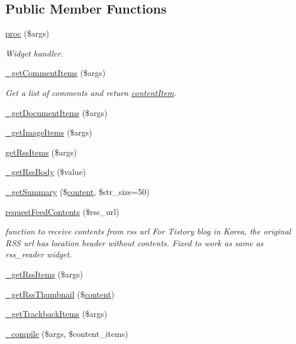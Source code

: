 \subsection*{Public Member Functions}
\begin{DoxyCompactItemize}
\item 
\hyperlink{classcontent_aacac5eb20ef4b64552d77bd5d2e2bf99}{proc} (\$args)
\begin{DoxyCompactList}\small\item\em Widget handler. \end{DoxyCompactList}\item 
\hyperlink{classcontent_a257f112a3719c28356bd49c336d3ad2f}{\+\_\+get\+Comment\+Items} (\$args)
\begin{DoxyCompactList}\small\item\em Get a list of comments and return \hyperlink{classcontentItem}{content\+Item}. \end{DoxyCompactList}\item 
\hyperlink{classcontent_ac3e0ed7e0c14712bd93e68cae1603e2f}{\+\_\+get\+Document\+Items} (\$args)
\item 
\hyperlink{classcontent_abdff6ddbe036e410913b5da1b9a5ce1b}{\+\_\+get\+Image\+Items} (\$args)
\item 
\hyperlink{classcontent_a78e600f4e35fe539b4ae34218d702e04}{get\+Rss\+Items} (\$args)
\item 
\hyperlink{classcontent_a75dcd12f149001ea88ceb13a286ce040}{\+\_\+get\+Rss\+Body} (\$value)
\item 
\hyperlink{classcontent_ae3e4dc54c21e3ac9eb67d547d914661a}{\+\_\+get\+Summary} (\$\hyperlink{classcontent}{content}, \$str\+\_\+size=50)
\item 
\hyperlink{classcontent_a6f9991d17df1b915196ca159512552a1}{request\+Feed\+Contents} (\$rss\+\_\+url)
\begin{DoxyCompactList}\small\item\em function to receive contents from rss url For Tistory blog in Korea, the original R\+SS url has location header without contents. Fixed to work as same as rss\+\_\+reader widget. \end{DoxyCompactList}\item 
\hyperlink{classcontent_aa541a575f915fc5fddbd5075a545d991}{\+\_\+get\+Rss\+Items} (\$args)
\item 
\hyperlink{classcontent_afe1cfad315cf8f3aeb352b22d0020142}{\+\_\+get\+Rss\+Thumbnail} (\$\hyperlink{classcontent}{content})
\item 
\hyperlink{classcontent_a4cdf2e0d2ede8a8bca1c61526f920adc}{\+\_\+get\+Trackback\+Items} (\$args)
\item 
\hyperlink{classcontent_a297e1dd4d257abab532a9a9d99847ee8}{\+\_\+compile} (\$args, \$content\+\_\+items)
\end{DoxyCompactItemize}
